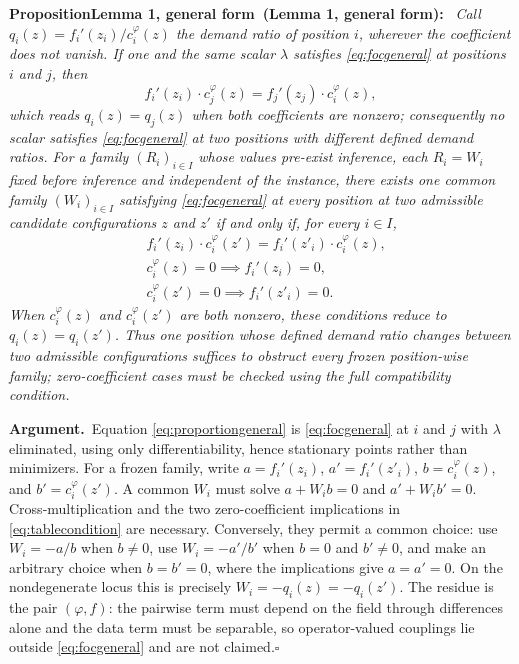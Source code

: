 \documentclass[twoside,11pt]{article}
\newenvironment{uprop}[1][]{\par\medskip\noindent\textbf{Proposition\ifx\relax#1\relax\else\ (#1)\fi:}\ \itshape}{\par\medskip} %
\newcommand{\argument}{\par\medskip\noindent\textbf{Argument.}\ }
\newcommand{\qedbox}{\hfill$\square$}
\begin{document}
\begin{uprop}[Lemma 1, general form]
Call $q_i(z) = f_i'(z_i)/c_i^{\varphi}(z)$ the \emph{demand ratio} of position $i$, wherever the coefficient does not vanish. If one and the same scalar $\lambda$ satisfies \eqref{eq:focgeneral} at positions $i$ and $j$, then
\begin{equation}
f_i'(z_i) \cdot c_j^{\varphi}(z) = f_j'(z_j) \cdot c_i^{\varphi}(z),
\label{eq:proportiongeneral}%
\end{equation}%
which reads $q_i(z) = q_j(z)$ when both coefficients are nonzero; consequently no scalar satisfies \eqref{eq:focgeneral} at two positions with different defined demand ratios. For a family $(R_i)_{i \in I}$ whose values pre-exist inference, each $R_i = W_i$ fixed before inference and independent of the instance, there exists one common family $(W_i)_{i\in I}$ satisfying \eqref{eq:focgeneral} at every position at two admissible candidate configurations $z$ and $z'$ if and only if, for every $i\in I$,
\begin{equation}
\begin{aligned}
& f_i'(z_i) \cdot c_i^{\varphi}(z') = f_i'(z'_i) \cdot c_i^{\varphi}(z), \\
& c_i^{\varphi}(z)=0 \implies f_i'(z_i)=0, \\
& c_i^{\varphi}(z')=0 \implies f_i'(z'_i)=0 .
\end{aligned}
\label{eq:tablecondition}%
\end{equation}%
When $c_i^{\varphi}(z)$ and $c_i^{\varphi}(z')$ are both nonzero, these conditions reduce to $q_i(z)=q_i(z')$. Thus one position whose defined demand ratio changes between two admissible configurations suffices to obstruct every frozen position-wise family; zero-coefficient cases must be checked using the full compatibility condition.
\end{uprop}

\argument Equation \eqref{eq:proportiongeneral} is \eqref{eq:focgeneral} at $i$ and $j$ with $\lambda$ eliminated, using only differentiability, hence stationary points rather than minimizers. For a frozen family, write $a=f_i'(z_i)$, $a'=f_i'(z'_i)$, $b=c_i^{\varphi}(z)$, and $b'=c_i^{\varphi}(z')$. A common $W_i$ must solve $a+W_ib=0$ and $a'+W_ib'=0$. Cross-multiplication and the two zero-coefficient implications in \eqref{eq:tablecondition} are necessary. Conversely, they permit a common choice: use $W_i=-a/b$ when $b\neq0$, use $W_i=-a'/b'$ when $b=0$ and $b'\neq0$, and make an arbitrary choice when $b=b'=0$, where the implications give $a=a'=0$. On the nondegenerate locus this is precisely $W_i=-q_i(z)=-q_i(z')$. The residue is the pair $(\varphi, f)$: the pairwise term must depend on the field through differences alone and the data term must be separable, so operator-valued couplings lie outside \eqref{eq:focgeneral} and are not claimed.\qedbox
\end{document}
